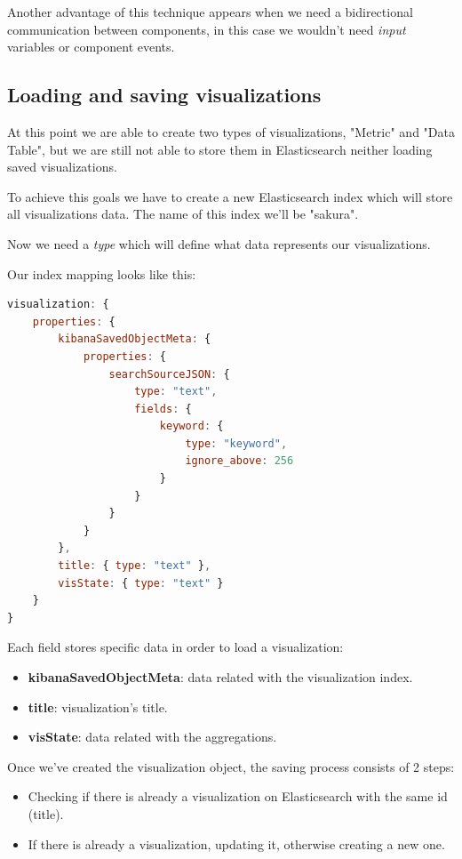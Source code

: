 \documentclass[a4paper, 12pt, english]{book}
\begin{document}
Another advantage of this technique appears when we need a bidirectional communication between components, in this case we wouldn't need \textit{input} variables or component events.


\subsection{Loading and saving visualizations}
\label{sec:loading-and-saving}
At this point we are able to create two types of visualizations, "Metric" and "Data Table", but we are still not able to store them in Elasticsearch neither loading saved visualizations.

To achieve this goals we have to create a new Elasticsearch index which will store all visualizations data. The name of this index we'll be "sakura".

Now we need a \textit{type} which will define what data represents our visualizations.

Our index mapping looks like this:
\begin{lstlisting}[language=javascript]
visualization: {
    properties: {
        kibanaSavedObjectMeta: {
            properties: {
                searchSourceJSON: {
                    type: "text",
                    fields: {
                        keyword: {
                            type: "keyword",
                            ignore_above: 256
                        }
                    }
                }
            }
        },
        title: { type: "text" },
        visState: { type: "text" }
    }
}
\end{lstlisting}

Each field stores specific data in order to load a visualization:
\begin{itemize}
    \item \textbf{kibanaSavedObjectMeta}: data related with the visualization index.
    \item \textbf{title}: visualization's title.
    \item \textbf{visState}: data related with the aggregations.
\end{itemize}

Once we've created the visualization object, the saving process consists of 2 steps:
\begin{itemize}
    \item Checking if there is already a visualization on Elasticsearch with the same id (title).
    \item If there is already a visualization, updating it, otherwise creating a new one.
\end{itemize}
\end{document}
